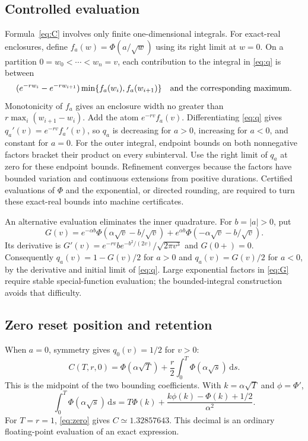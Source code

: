 \documentclass[11pt,a4paper]{article}
\newcommand{\dd}{\,\mathrm d}
\begin{document}
\subsection{Controlled evaluation}
Formula~\eqref{eq:C} involves only finite one-dimensional integrals.
For exact-real enclosures, define $f_a(w)=\Phi(a/\sqrt w)$ using its right
limit at $w=0$. On a partition $0=w_0<\cdots<w_n=v$, each contribution
to the integral in \eqref{eq:q} is between
\[
(e^{-rw_i}-e^{-rw_{i+1}})
\min\{f_a(w_i),f_a(w_{i+1})\}
\quad\hbox{and the corresponding maximum.}
\]
Monotonicity of $f_a$ gives an enclosure width no greater than
$r\max_i(w_{i+1}-w_i)$. Add the atom $e^{-rv}f_a(v)$.
Differentiating \eqref{eq:q} gives $q_a'(v)=e^{-rv}f_a'(v)$, so $q_a$
is decreasing for $a>0$, increasing for $a<0$, and constant for $a=0$.
For the outer integral, endpoint bounds on both nonnegative factors bracket
their product on every subinterval. Use the right limit of $q_a$ at zero
for these endpoint bounds. Refinement converges because the factors have bounded
variation and continuous extensions from positive durations.
Certified evaluations of $\Phi$ and the exponential, or directed rounding,
are required to turn these exact-real bounds into machine certificates.

An alternative evaluation eliminates the inner quadrature. For $b=|a|>0$, put
\begin{equation}\label{eq:G}
G(v)=e^{-\alpha b}\Phi(\alpha\sqrt v-b/\sqrt v)
+e^{\alpha b}\Phi(-\alpha\sqrt v-b/\sqrt v).
\end{equation}
Its derivative is
$G'(v)=e^{-rv}b e^{-b^2/(2v)}/\sqrt{2\pi v^3}$ and $G(0+)=0$.
Consequently $q_a(v)=1-G(v)/2$ for $a>0$ and $q_a(v)=G(v)/2$
for $a<0$, by the derivative and initial limit of \eqref{eq:q}.
Large exponential factors in \eqref{eq:G} require stable special-function
evaluation; the bounded-integral construction avoids that difficulty.

\subsection{Zero reset position and retention}
When $a=0$, symmetry gives $q_0(v)=1/2$ for $v>0$:
\begin{equation}\label{eq:zero}
C(T,r,0)=\Phi(\alpha\sqrt T)+\frac r2
\int_0^T\Phi(\alpha\sqrt s)\dd s.
\end{equation}
This is the midpoint of the two bounding coefficients. With $k=\alpha\sqrt T$
and $\phi=\Phi'$,
\begin{equation}\label{eq:I}
\int_0^T\Phi(\alpha\sqrt s)\dd s
=T\Phi(k)+\frac{k\phi(k)-\Phi(k)+1/2}{\alpha^2}.
\end{equation}
For $T=r=1$, \eqref{eq:zero} gives $C\simeq1.32857643$.
This decimal is an ordinary floating-point evaluation of an exact expression.
\end{document}
